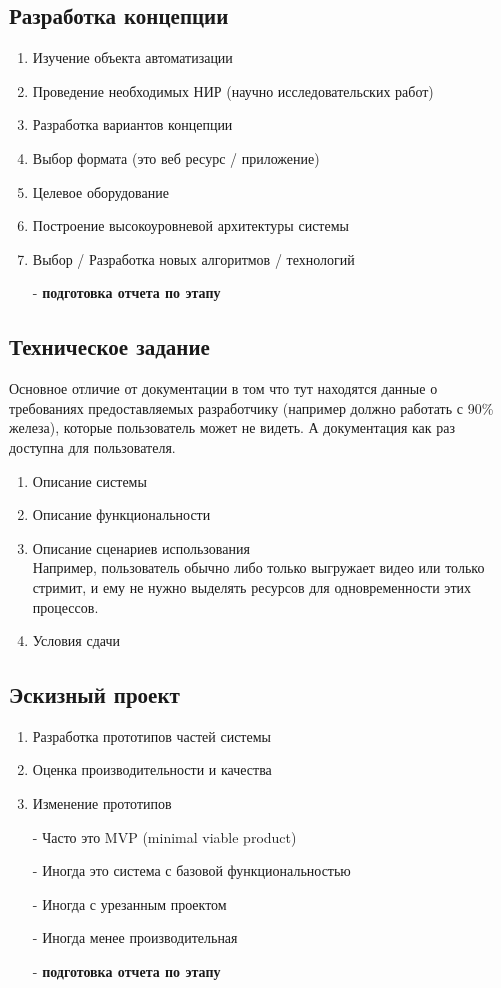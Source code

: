 \documentclass[12pt; a4paper]{book}
\theoremstyle{plain} %
\theoremstyle{defenition}
\theoremstyle{remark}
\begin{document}
\subsection{Разработка концепции}
\begin{enumerate}
\item Изучение объекта автоматизации
\item Проведение необходимых НИР (научно исследовательских работ)
\item Разработка вариантов концепции
\item Выбор формата (это веб ресурс / приложение)
\item Целевое оборудование
\item Построение высокоуровневой архитектуры системы
\item Выбор / Разработка новых алгоритмов / технологий
\item[-] \textbf{подготовка отчета по этапу}
\end{enumerate}

\subsection{Техническое задание}
Основное отличие от документации в том что тут находятся данные о требованиях
предоставляемых разработчику (например должно работать с 90\% железа), которые пользователь может не видеть. А документация как раз доступна для пользователя.
\begin{enumerate}
\item Описание системы
\item Описание функциональности
\item \hangindent=6cm  \noindent Описание сценариев использования\\ {\footnotesize Например, пользователь обычно либо только выгружает видео или только стримит, и ему не нужно выделять ресурсов для одновременности этих процессов.}
\item Условия сдачи
\end{enumerate}

\subsection{Эскизный проект}
\begin{enumerate}
\item Разработка прототипов частей системы
\item Оценка производительности и качества
\item Изменение прототипов
\item[-] Часто это MVP (minimal viable product)
\item[-] Иногда это система с базовой функциональностью
\item[-] Иногда с урезанным проектом
\item[-] Иногда менее производительная
\item[-] \textbf{подготовка отчета по этапу}
\end{enumerate}
\end{document}
